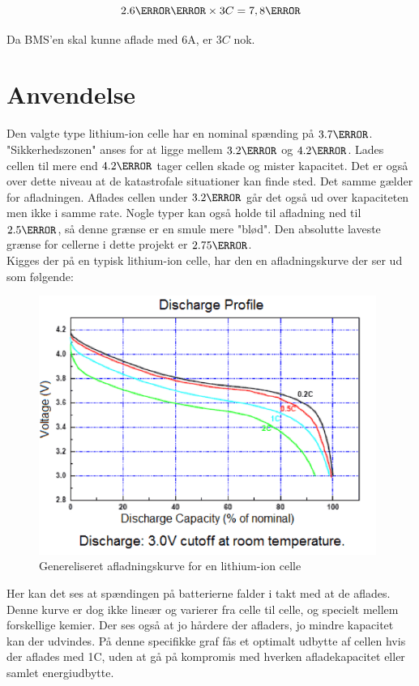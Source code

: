 \begin {equation}
2.6\ampere\hour \times 3C = 7,8\ampere
\end {equation}

Da BMS'en skal kunne aflade med 6A, er $3C$ nok.

\section{Anvendelse}
Den valgte type lithium-ion celle har en nominal spænding på $3.7\volt$. "Sikkerhedszonen" \space anses for at ligge mellem $3.2\volt$ og $4.2\volt$. Lades cellen til mere end $4.2\volt$ tager cellen skade og mister kapacitet. Det er også over dette niveau at de katastrofale situationer kan finde sted. Det samme gælder for afladningen. Aflades cellen under $3.2\volt$ går det også ud over kapaciteten men ikke i samme rate. Nogle typer kan også holde til afladning ned til $2.5\volt$, så denne grænse er en smule mere "blød". Den absolutte laveste grænse for cellerne i dette projekt er $2.75\volt$. \\

Kigges der på en typisk lithium-ion celle, har den en afladningskurve der ser ud som følgende: 

\begin{figure}[h]
\centering
\includegraphics[width=11cm]{billeder/discharge_curve.png}
\caption{Genereliseret afladningskurve for en lithium-ion celle}
\label{fig:discharge_curve}
\end{figure}

Her kan det ses at spændingen på batterierne falder i takt med at de aflades. Denne kurve er dog ikke lineær og varierer fra celle til celle, og specielt mellem forskellige kemier. Der ses også at jo hårdere der afladers, jo mindre kapacitet kan der udvindes. På denne specifikke graf fås et optimalt udbytte af cellen hvis der aflades med 1C, uden at gå på kompromis med hverken afladekapacitet eller samlet energiudbytte. \\

